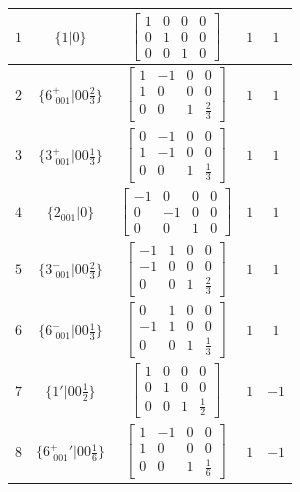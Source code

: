 \documentclass[fleqn,8pt]{jsarticle}
\begin{document}
\begin{longtable}{ccccc}
$ 1 $ & $ \{1|0\} $ & $ \begin{bmatrix} 1 & 0 & 0 & 0 \\ 0 & 1 & 0 & 0 \\ 0 & 0 & 1 & 0 \end{bmatrix} $ & $ 1 $ & $ 1 $ \\ \hline
$ 2 $ & $ \{6^{+}_{\,\,001}|0 0 \frac{2}{3}\} $ & $ \begin{bmatrix} 1 & -1 & 0 & 0 \\ 1 & 0 & 0 & 0 \\ 0 & 0 & 1 & \frac{2}{3} \end{bmatrix} $ & $ 1 $ & $ 1 $ \\ \hline
$ 3 $ & $ \{3^{+}_{\,\,001}|0 0 \frac{1}{3}\} $ & $ \begin{bmatrix} 0 & -1 & 0 & 0 \\ 1 & -1 & 0 & 0 \\ 0 & 0 & 1 & \frac{1}{3} \end{bmatrix} $ & $ 1 $ & $ 1 $ \\ \hline
$ 4 $ & $ \{2{}_{001}|0\} $ & $ \begin{bmatrix} -1 & 0 & 0 & 0 \\ 0 & -1 & 0 & 0 \\ 0 & 0 & 1 & 0 \end{bmatrix} $ & $ 1 $ & $ 1 $ \\ \hline
$ 5 $ & $ \{3^{-}_{\,\,001}|0 0 \frac{2}{3}\} $ & $ \begin{bmatrix} -1 & 1 & 0 & 0 \\ -1 & 0 & 0 & 0 \\ 0 & 0 & 1 & \frac{2}{3} \end{bmatrix} $ & $ 1 $ & $ 1 $ \\ \hline
$ 6 $ & $ \{6^{-}_{\,\,001}|0 0 \frac{1}{3}\} $ & $ \begin{bmatrix} 0 & 1 & 0 & 0 \\ -1 & 1 & 0 & 0 \\ 0 & 0 & 1 & \frac{1}{3} \end{bmatrix} $ & $ 1 $ & $ 1 $ \\ \hline
$ 7 $ & $ \{1{}'|0 0 \frac{1}{2}\} $ & $ \begin{bmatrix} 1 & 0 & 0 & 0 \\ 0 & 1 & 0 & 0 \\ 0 & 0 & 1 & \frac{1}{2} \end{bmatrix} $ & $ 1 $ & $ -1 $ \\ \hline
$ 8 $ & $ \{6^{+}_{\,\,001}{}'|0 0 \frac{1}{6}\} $ & $ \begin{bmatrix} 1 & -1 & 0 & 0 \\ 1 & 0 & 0 & 0 \\ 0 & 0 & 1 & \frac{1}{6} \end{bmatrix} $ & $ 1 $ & $ -1 $ \\ \hline

\end{longtable}
\end{document}
